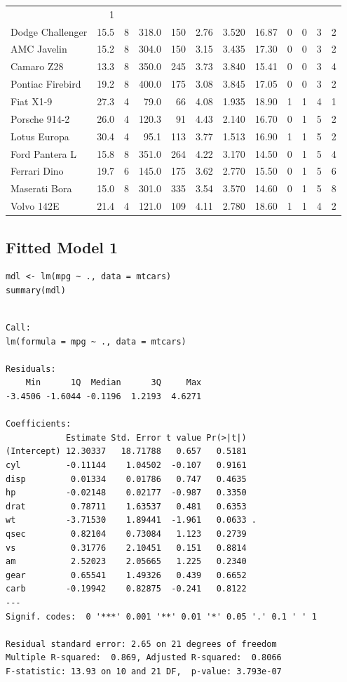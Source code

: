 \documentclass[
11pt,%
a4paper,%
]%
{article}%
\begin{document}
\begin{longtable}[]{@{}lrrrrrrrrrrr@{}}
& 1\tabularnewline
Dodge Challenger & 15.5 & 8 & 318.0 & 150 & 2.76 & 3.520 & 16.87 & 0 & 0
& 3 & 2\tabularnewline
AMC Javelin & 15.2 & 8 & 304.0 & 150 & 3.15 & 3.435 & 17.30 & 0 & 0 & 3
& 2\tabularnewline
Camaro Z28 & 13.3 & 8 & 350.0 & 245 & 3.73 & 3.840 & 15.41 & 0 & 0 & 3 &
4\tabularnewline
Pontiac Firebird & 19.2 & 8 & 400.0 & 175 & 3.08 & 3.845 & 17.05 & 0 & 0
& 3 & 2\tabularnewline
Fiat X1-9 & 27.3 & 4 & 79.0 & 66 & 4.08 & 1.935 & 18.90 & 1 & 1 & 4 &
1\tabularnewline
Porsche 914-2 & 26.0 & 4 & 120.3 & 91 & 4.43 & 2.140 & 16.70 & 0 & 1 & 5
& 2\tabularnewline
Lotus Europa & 30.4 & 4 & 95.1 & 113 & 3.77 & 1.513 & 16.90 & 1 & 1 & 5
& 2\tabularnewline
Ford Pantera L & 15.8 & 8 & 351.0 & 264 & 4.22 & 3.170 & 14.50 & 0 & 1 &
5 & 4\tabularnewline
Ferrari Dino & 19.7 & 6 & 145.0 & 175 & 3.62 & 2.770 & 15.50 & 0 & 1 & 5
& 6\tabularnewline
Maserati Bora & 15.0 & 8 & 301.0 & 335 & 3.54 & 3.570 & 14.60 & 0 & 1 &
5 & 8\tabularnewline
Volvo 142E & 21.4 & 4 & 121.0 & 109 & 4.11 & 2.780 & 18.60 & 1 & 1 & 4 &
2\tabularnewline
\bottomrule
\end{longtable}

\hypertarget{fitted-model-1}{%
\subsection{Fitted Model 1}\label{fitted-model-1}}

\begin{verbatim}
mdl <- lm(mpg ~ ., data = mtcars)
summary(mdl)
\end{verbatim}

\begin{verbatim}

Call:
lm(formula = mpg ~ ., data = mtcars)

Residuals:
    Min      1Q  Median      3Q     Max 
-3.4506 -1.6044 -0.1196  1.2193  4.6271 

Coefficients:
            Estimate Std. Error t value Pr(>|t|)  
(Intercept) 12.30337   18.71788   0.657   0.5181  
cyl         -0.11144    1.04502  -0.107   0.9161  
disp         0.01334    0.01786   0.747   0.4635  
hp          -0.02148    0.02177  -0.987   0.3350  
drat         0.78711    1.63537   0.481   0.6353  
wt          -3.71530    1.89441  -1.961   0.0633 .
qsec         0.82104    0.73084   1.123   0.2739  
vs           0.31776    2.10451   0.151   0.8814  
am           2.52023    2.05665   1.225   0.2340  
gear         0.65541    1.49326   0.439   0.6652  
carb        -0.19942    0.82875  -0.241   0.8122  
---
Signif. codes:  0 '***' 0.001 '**' 0.01 '*' 0.05 '.' 0.1 ' ' 1

Residual standard error: 2.65 on 21 degrees of freedom
Multiple R-squared:  0.869, Adjusted R-squared:  0.8066 
F-statistic: 13.93 on 10 and 21 DF,  p-value: 3.793e-07
\end{verbatim}
\end{document}

